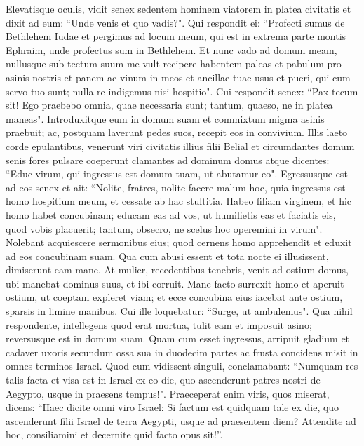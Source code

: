 \begin{biblechapter}
\verse Elevatisque oculis, vidit senex sedentem hominem viatorem in platea civitatis et dixit ad eum: “Unde venis et quo vadis?". 
\verse Qui respondit ei: “Profecti sumus de Bethlehem Iudae et pergimus ad locum meum, qui est in extrema parte montis Ephraim, unde profectus sum in Bethlehem. Et nunc vado ad domum meam, nullusque sub tectum suum me vult recipere 
\verse habentem paleas et pabulum pro asinis nostris et panem ac vinum in meos et ancillae tuae usus et pueri, qui cum servo tuo sunt; nulla re indigemus nisi hospitio". 
\verse Cui respondit senex: “Pax tecum sit! Ego praebebo omnia, quae necessaria sunt; tantum, quaeso, ne in platea maneas". 
\verse Introduxitque eum in domum suam et commixtum migma asinis praebuit; ac, postquam laverunt pedes suos, recepit eos in convivium. 
\verse Illis laeto corde epulantibus, venerunt viri civitatis illius filii Belial et circumdantes domum senis fores pulsare coeperunt clamantes ad dominum domus atque dicentes: “Educ virum, qui ingressus est domum tuam, ut abutamur eo". 
\verse Egressusque est ad eos senex et ait: “Nolite, fratres, nolite facere malum hoc, quia ingressus est homo hospitium meum, et cessate ab hac stultitia.  
\verse Habeo filiam virginem, et hic homo habet concubinam; educam eas ad vos, ut humilietis eas et faciatis eis, quod vobis placuerit; tantum, obsecro, ne scelus hoc operemini in virum". 
\verse Nolebant acquiescere sermonibus eius; quod cernens homo apprehendit et eduxit ad eos concubinam suam. Qua cum abusi essent et tota nocte ei illusissent, dimiserunt eam mane. 
\verse At mulier, recedentibus tenebris, venit ad ostium domus, ubi manebat dominus suus, et ibi corruit. 
\verse Mane facto surrexit homo et aperuit ostium, ut coeptam expleret viam; et ecce concubina eius iacebat ante ostium, sparsis in limine manibus.  
\verse Cui ille loquebatur: “Surge, ut ambulemus". Qua nihil respondente, intellegens quod erat mortua, tulit eam et imposuit asino; reversusque est in domum suam. 
\verse Quam cum esset ingressus, arripuit gladium et cadaver uxoris secundum ossa sua in duodecim partes ac frusta concidens misit in omnes terminos Israel. 
\verse Quod cum vidissent singuli, conclamabant: “Numquam res talis facta et visa est in Israel ex eo die, quo ascenderunt patres nostri de Aegypto, usque in praesens tempus!". Praeceperat enim viris, quos miserat, dicens: “Haec dicite omni viro Israel: Si factum est quidquam tale ex die, quo ascenderunt filii Israel de terra Aegypti, usque ad praesentem diem? Attendite ad hoc, consiliamini et decernite quid facto opus sit!”. 
\end{biblechapter}

